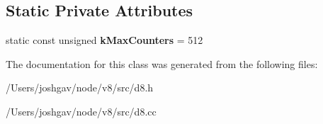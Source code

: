 \subsection*{Static Private Attributes}
\begin{DoxyCompactItemize}
\item 
static const unsigned {\bfseries k\+Max\+Counters} = 512\hypertarget{classv8_1_1_counter_collection_ad7f016f772531ce4d3fc7028d22e3948}{}\label{classv8_1_1_counter_collection_ad7f016f772531ce4d3fc7028d22e3948}

\end{DoxyCompactItemize}


The documentation for this class was generated from the following files\+:\begin{DoxyCompactItemize}
\item 
/\+Users/joshgav/node/v8/src/d8.\+h\item 
/\+Users/joshgav/node/v8/src/d8.\+cc\end{DoxyCompactItemize}
